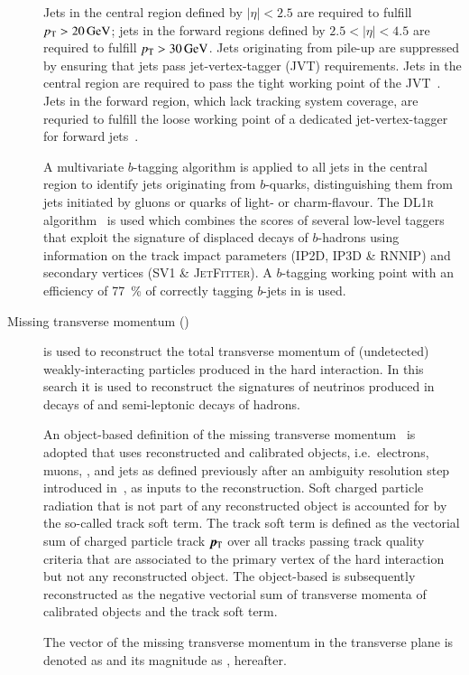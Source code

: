 \begin{description}
  Jets in the central region defined by $|\eta| < 2.5$ are required to
  fulfill $\pT > \SI{20}{\GeV}$; jets in the forward regions defined
  by $2.5 < |\eta| < 4.5$ are required to fulfill
  $\pT > \SI{30}{\GeV}$. Jets originating from pile-up are suppressed
  by ensuring that jets pass jet-vertex-tagger (JVT)
  requirements. Jets in the central region are required to pass the
  tight working point of the JVT~\cite{PERF-2014-03}. Jets in the
  forward region, which lack tracking system coverage, are requried to
  fulfill the loose working point of a dedicated jet-vertex-tagger for
  forward jets~\cite{PERF-2016-06-witherratum,ATL-PHYS-PUB-2019-026}.

  A multivariate $b$-tagging algorithm is applied to all jets in the
  central region to identify jets originating from $b$-quarks,
  distinguishing them from jets initiated by gluons or quarks of
  light- or charm-flavour. The \textsc{DL1r}
  algorithm~\cite{FTAG-2018-01,ATL-PHYS-PUB-2017-013} is used which
  combines the scores of several low-level taggers that exploit the
  signature of displaced decays of $b$-hadrons using information on
  the track impact parameters (\textsc{IP2D}, \textsc{IP3D} \&
  \textsc{RNNIP}) and secondary vertices (\textsc{SV1} \&
  \textsc{JetFitter}). A $b$-tagging working point with an efficiency
  of \SI{77}{\percent} of correctly tagging $b$-jets in \ttbar is
  used.

\item[Missing transverse momentum (\pTmiss)] is used to reconstruct
  the total transverse momentum of (undetected) weakly-interacting
  particles produced in the hard interaction. In this search it is
  used to reconstruct the signatures of neutrinos produced in decays
  of \tauleptons and semi-leptonic decays of hadrons.

  An object-based definition of the missing transverse
  momentum~\cite{PERF-2016-07} is adopted that uses reconstructed and
  calibrated objects, i.e.\ electrons, muons, \tauhadvis, and jets as
  defined previously after an ambiguity resolution step introduced
  in~, as inputs to the \pTmiss
  reconstruction. Soft charged particle radiation that is not part of
  any reconstructed object is accounted for by the so-called track
  soft term. The track soft term is defined as the vectorial sum of
  charged particle track $\myvec{\pT}$ over all tracks passing track
  quality criteria that are associated to the primary vertex of the
  hard interaction but not any reconstructed object. The object-based
  \pTmiss is subsequently reconstructed as the negative vectorial sum
  of transverse momenta of calibrated objects and the track soft term.

  The vector of the missing transverse momentum in the transverse
  plane is denoted as \pTmiss and its magnitude as \pTmissAbs,
  hereafter.
\end{description}


